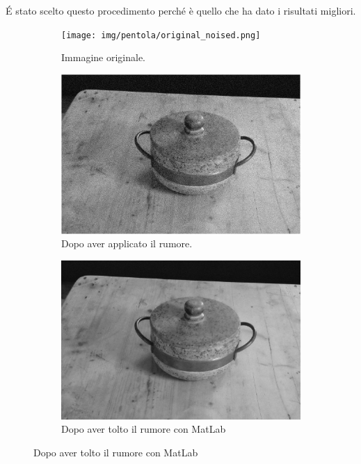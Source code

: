 \documentclass[12pt]{report}
\begin{document}
\'E stato scelto questo procedimento perch\'e \`e quello che ha dato i risultati migliori.
\begin{figure}[H]
  \centering
  \begin{subfigure}[b]{0.4\linewidth}
    \centering
    \texttt{[image: img/pentola/original\_noised.png]}
    \caption{Immagine originale.}
  \end{subfigure}
  \begin{subfigure}[b]{0.4\linewidth}
    \centering
    \includegraphics[width=\linewidth]{img/pentola/noised_image.png}
    \caption{Dopo aver applicato il rumore.}
  \end{subfigure}
  \begin{subfigure}[b]{0.6\linewidth}
    \centering
    \includegraphics[width=\linewidth]{img/pentola/denoised_AI.jpg}
    \caption{Dopo aver tolto il rumore con MatLab}
  \end{subfigure}
\end{figure}
\end{document}

